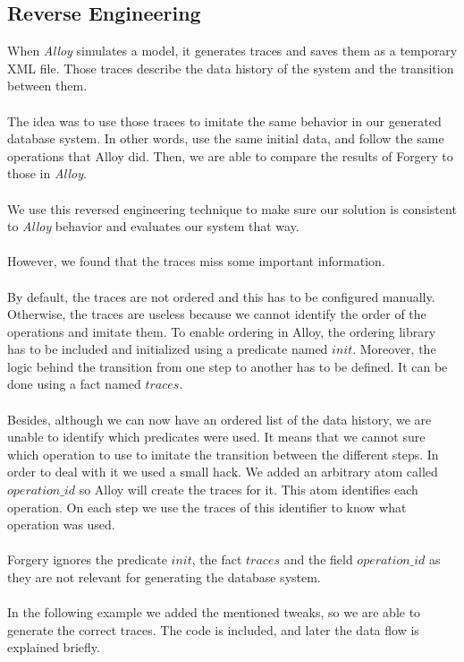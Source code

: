 \documentclass[oneside]{book}
\begin{document}
\subsection{Reverse Engineering}
When \textit{Alloy} simulates a model, it generates traces and saves them as a temporary XML file. Those traces describe the data history of the system and the transition between them.\\\\
The idea was to use those traces to imitate the same behavior in our generated database system. In other words, use the same initial data, and follow the same operations that Alloy did. Then, we are able to compare the results of Forgery to those in \textit{Alloy}.\\\\
We use this reversed engineering technique to make sure our solution is consistent to \textit{Alloy} behavior and evaluates our system that way.\\\\
However, we found that the traces miss some important information.\\\\
By default, the traces are not ordered and this has to be configured manually. Otherwise, the traces are useless because we cannot identify the order of the operations and imitate them. To enable ordering in Alloy, the ordering library has to be included and initialized using a predicate named $init$. Moreover, the logic behind the transition from one step to another has to be defined. It can be done using a fact named $traces$.\\\\
Besides, although we can now have an ordered list of the data history, we are unable to identify which predicates were used. It means that we cannot sure which operation to use to imitate the transition between the different steps. In order to deal with it we used a small hack. We added an arbitrary atom called $operation\_id$ so Alloy will create the traces for it. This atom identifies each operation. On each step we use the traces of this identifier to know what operation was used.\\\\
Forgery ignores the predicate $init$, the fact $traces$ and the field $operation\_id$ as they are not relevant for generating the database system.\\\\
In the following example we added the mentioned tweaks, so we are able to generate the correct traces. The code is included, and later the data flow is explained briefly.\\
\end{document}
